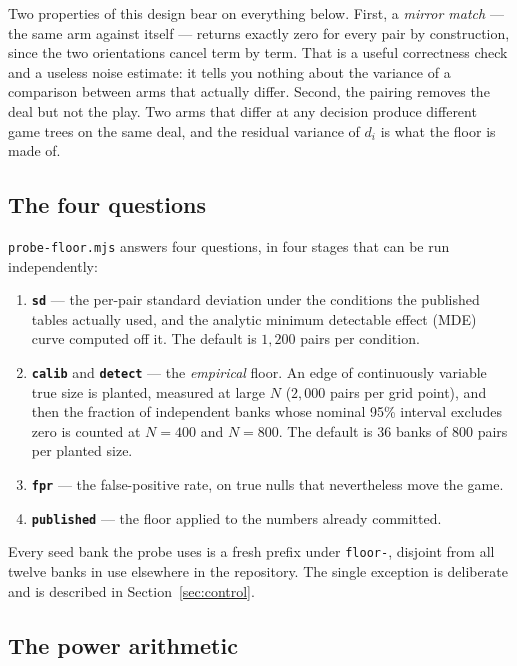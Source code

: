 \documentclass[11pt]{article}
\newcommand{\code}[1]{\texttt{#1}}
\begin{document}
Two properties of this design bear on everything below. First, a \emph{mirror match} --- the same
arm against itself --- returns exactly zero for every pair by construction, since the two
orientations cancel term by term. That is a useful correctness check and a useless noise estimate:
it tells you nothing about the variance of a comparison between arms that actually differ. Second,
the pairing removes the deal but not the play. Two arms that differ at any decision produce
different game trees on the same deal, and the residual variance of $d_i$ is what the floor is made
of.

\subsection{The four questions}

\code{probe-floor.mjs} \cite{probefloor} answers four questions, in four stages that can be run
independently:

\begin{enumerate}
  \item \textbf{\code{sd}} --- the per-pair standard deviation under the conditions the published
  tables actually used, and the analytic minimum detectable effect (MDE) curve computed off it. The
  default is $1{,}200$ pairs per condition.
  \item \textbf{\code{calib}} and \textbf{\code{detect}} --- the \emph{empirical} floor. An edge of
  continuously variable true size is planted, measured at large $N$ ($2{,}000$ pairs per grid
  point), and then the fraction of independent banks whose nominal 95\% interval excludes zero is
  counted at $N=400$ and $N=800$. The default is 36 banks of 800 pairs per planted size.
  \item \textbf{\code{fpr}} --- the false-positive rate, on true nulls that nevertheless move the
  game.
  \item \textbf{\code{published}} --- the floor applied to the numbers already committed.
\end{enumerate}

Every seed bank the probe uses is a fresh prefix under \code{floor-}, disjoint from all twelve
banks in use elsewhere in the repository. The single exception is deliberate and is described in
Section~\ref{sec:control}.

\subsection{The power arithmetic}
\end{document}
